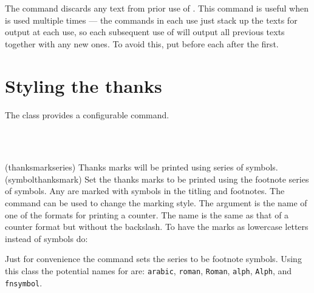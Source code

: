 The \cmd{\emptythanks} command discards any text from prior use of 
\cmd{\thanks}.
This command is useful when \cmd{\maketitle} is used multiple times ---
the \cmd{\thanks} commands in each use just stack up the texts for output
at each use, so each subsequent use of \cmd{\maketitle} will output all 
previous \cmd{\thanks} texts together with any new ones. To avoid this,
put \cmd{\emptythanks} before each \cmd{\maketitle} after the first.



\section{Styling the thanks} \label{sec:thanks}


    The class provides a configurable \cmd{\thanks} command.

\begin{syntax}
\cmd{\thanksmarkseries} \\
\cmd{\symbolthanksmark} \\
\end{syntax}
\glossary(thanksmarkseries)%
  {}%
  {Thanks marks will be printed using  series of symbols.}
\glossary(symbolthanksmark)%
  {}
  {Set the thanks marks to be printed using the footnote series of symbols.}
 Any \cmd{\thanks} are marked with symbols in the 
titling and footnotes.
The command \cmd{\thanksmarkseries} 
can be used to change the marking style. The  argument
is the name of one of the formats for printing a counter. The name 
is the same as that of a counter format but without the backslash.
To have the \cmd{\thanks} marks as lowercase letters instead of symbols 
do:
\begin{lcode}
\end{lcode}
Just for convenience the \cmd{\symbolthanksmark} command sets the series
to be footnote symbols.
Using this class the potential names for  are:
\texttt{arabic}, \texttt{roman}, \texttt{Roman}, \texttt{alph}, 
\texttt{Alph}, and \texttt{fnsymbol}. 

